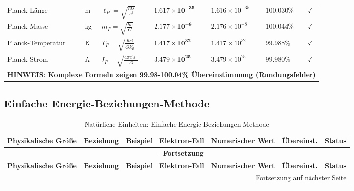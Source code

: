 \documentclass[12pt,a4paper]{article}
\begin{document}
\begin{landscape}
\begin{longtable}{p{4cm}p{1.8cm}p{3.8cm}p{3.2cm}p{3.2cm}p{1.8cm}p{1cm}}
		Planck-Länge & m & $\ell_P = \sqrt{\frac{\hbar G}{c^3}}$ & $\mathbf{1.617 \times 10^{-35}}$ & $1.616 \times 10^{-35}$ & $\mathbf{100.030\%}$ & $\checkmark$ \\
		
		Planck-Masse & kg & $m_P = \sqrt{\frac{\hbar c}{G}}$ & $\mathbf{2.177 \times 10^{-8}}$ & $2.176 \times 10^{-8}$ & $\mathbf{100.044\%}$ & $\checkmark$ \\
		
		Planck-Temperatur & K & $T_P = \sqrt{\frac{\hbar c^5}{G k_B^2}}$ & $\mathbf{1.417 \times 10^{32}}$ & $1.417 \times 10^{32}$ & $\mathbf{99.988\%}$ & $\checkmark$ \\
		
		Planck-Strom & A & $I_P = \sqrt{\frac{4\pi c^6 \varepsilon_0}{G}}$ & $\mathbf{3.479 \times 10^{25}}$ & $3.479 \times 10^{25}$ & $\mathbf{99.980\%}$ & $\checkmark$ \\
		
		\multicolumn{7}{l}{\textbf{HINWEIS: Komplexe Formeln zeigen 99.98-100.04\% Übereinstimmung (Rundungsfehler)}} \\
		
	\end{longtable}
	\normalsize
	
	\newpage	
	\subsection{Einfache Energie-Beziehungen-Methode}
	
	\footnotesize
	\begin{longtable}{p{3.5cm}p{2cm}p{2.5cm}p{4cm}p{3cm}p{1.8cm}p{1cm}}
		\caption{Natürliche Einheiten: Einfache Energie-Beziehungen-Methode} \\
		\toprule
		\textbf{Physikalische Größe} & \textbf{Beziehung} & \textbf{Beispiel} & \textbf{Elektron-Fall} & \textbf{Numerischer Wert} & \textbf{Übereinst.} & \textbf{Status} \\
		\midrule
		\endfirsthead
		
		\multicolumn{7}{c}{{\bfseries \tablename\ \thetable{} -- Fortsetzung}} \\
		\toprule
		\textbf{Physikalische Größe} & \textbf{Beziehung} & \textbf{Beispiel} & \textbf{Elektron-Fall} & \textbf{Numerischer Wert} & \textbf{Übereinst.} & \textbf{Status} \\
		\midrule
		\endhead
		
		\bottomrule
		\multicolumn{7}{r}{{Fortsetzung auf nächster Seite}} \\
		\endfoot
		

\end{longtable}
\end{landscape}
\end{document}

